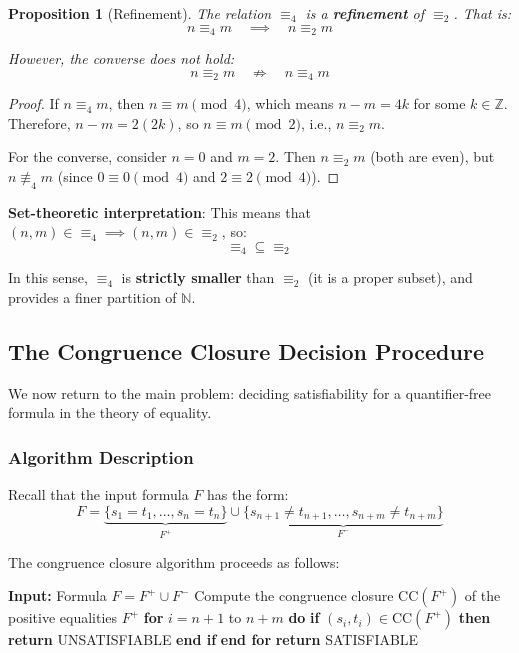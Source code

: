 \documentclass[11pt,a4paper]{article}
\theoremstyle{definition}
\theoremstyle{plain}
\newtheorem{proposition}[theorem]{Proposition}
\theoremstyle{remark}
\newcommand{\N}{\mathbb{N}}
\begin{document}
\begin{proposition}[Refinement]
The relation $\equiv_4$ is a \textbf{refinement} of $\equiv_2$. That is:
\[
n \equiv_4 m \quad \implies \quad n \equiv_2 m
\]

However, the converse does not hold:
\[
n \equiv_2 m \quad \not\Rightarrow \quad n \equiv_4 m
\]
\end{proposition}

\begin{proof}
If $n \equiv_4 m$, then $n \equiv m \pmod{4}$, which means $n - m = 4k$ for some $k \in \mathbb{Z}$. Therefore, $n - m = 2(2k)$, so $n \equiv m \pmod{2}$, i.e., $n \equiv_2 m$.

For the converse, consider $n = 0$ and $m = 2$. Then $n \equiv_2 m$ (both are even), but $n \not\equiv_4 m$ (since $0 \equiv 0 \pmod{4}$ and $2 \equiv 2 \pmod{4}$).
\end{proof}

\textbf{Set-theoretic interpretation}: This means that $(n, m) \in {\equiv_4} \implies (n, m) \in {\equiv_2}$, so:
\[
{\equiv_4} \subseteq {\equiv_2}
\]

In this sense, $\equiv_4$ is \textbf{strictly smaller} than $\equiv_2$ (it is a proper subset), and provides a finer partition of $\N$.

\subsection{The Congruence Closure Decision Procedure}

We now return to the main problem: deciding satisfiability for a quantifier-free formula in the theory of equality.

\subsubsection{Algorithm Description}

Recall that the input formula $F$ has the form:
\[
F = \underbrace{\{s_1 = t_1, \dots, s_n = t_n\}}_{F^+} \cup \underbrace{\{s_{n+1} \neq t_{n+1}, \dots, s_{n+m} \neq t_{n+m}\}}_{F^-}
\]

The congruence closure algorithm proceeds as follows:

\begin{algorithm}[H]
\caption{Congruence Closure Decision Procedure}
\begin{algorithmic}[1]
\STATE \textbf{Input:} Formula $F = F^+ \cup F^-$
\STATE Compute the congruence closure $\text{CC}(F^+)$ of the positive equalities $F^+$
\STATE \textbf{for} $i = n+1$ to $n+m$ \textbf{do}
\STATE \quad \textbf{if} $(s_i, t_i) \in \text{CC}(F^+)$ \textbf{then}
\STATE \quad \quad \textbf{return} UNSATISFIABLE
\STATE \quad \textbf{end if}
\STATE \textbf{end for}
\STATE \textbf{return} SATISFIABLE
\end{algorithmic}
\end{algorithm}
\end{document}
